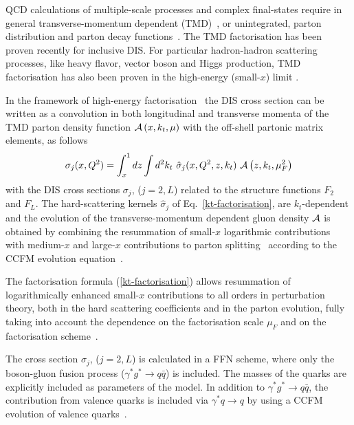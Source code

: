 \def\kt{\ensuremath{k_t}}
\def\pt{\ensuremath{p_t}}


QCD calculations of multiple-scale processes  and complex final-states
require in general transverse-momentum dependent (TMD)~\cite{Collins:2011zzd}, or 
unintegrated, parton distribution and parton decay 
functions~\cite{Aybat:2011zv,Buffing:2013eka,Buffing:2013kca,Buffing:2012sz,Mulders:2008tf,Jadach:2009gm,Hautmann:2009zzb,Hautmann:2012pf,Hautmann:2007gw}.   
The TMD factorisation has been proven recently \cite{Collins:2011zzd} for inclusive DIS. For 
particular hadron-hadron scattering processes, like heavy flavor, vector boson and Higgs production, 
TMD factorisation has also been proven in the high-energy (small-$x$) limit \cite{Catani:1990xk,Collins:1991ty,Hautmann:2010be}.
  
In the framework of high-energy factorisation~\cite{Catani:1990xk,Catani:1990eg,Catani:1993ww} 
the DIS cross section can be written as a convolution in 
both longitudinal and transverse momenta of the TMD parton density function 
${\cal A}\left(x,\kt,\mu\right)$    
 with the off-shell partonic matrix elements, as follows 
\begin{equation}
 \sigma_j (x, Q^2) = \int_x^1  
d z \int d^2k_t \ 
\hat{\sigma}_j(x,Q^2,{z},k_t) \ 
 {\cal  A}\left( {z} ,\kt, \mu_{F}^2 \right) 
\label{kt-factorisation}
\end{equation}
with the DIS cross sections 
$\sigma_j$, ($j= 2 , L$) related to the  structure functions $F_2$ and $F_L$.
The hard-scattering kernels ${\hat \sigma}_j$ of Eq.~\ref{kt-factorisation},    are $k_t$-dependent and the evolution  of the 
transverse-momentum dependent gluon density 
${\cal A} $ is obtained by combining the resummation of small-$x$ logarithmic 
contributions \cite{Lipatov:1996ts,Fadin:1975cb,Balitsky:1978ic} with medium-$x$ and large-$x$ 
contributions to parton  splitting~\cite{Gribov:1972ri,Altarelli:1977zs,Dokshitzer:1977sg} according to the 
CCFM evolution equation~\cite{Ciafaloni:1987ur,Catani:1989sg,Marchesini:1994wr}.
  
The factorisation formula (\ref{kt-factorisation})  
allows resummation of logarithmically enhanced small-$x$ contributions  
to all orders in perturbation theory,  
both in the  hard scattering coefficients and 
in the parton evolution, fully taking into account the 
dependence on the factorisation scale $\mu_{F}$ and on the 
factorisation scheme~\cite{Catani:1994sq,Catani:1993rn}.  
 
The cross section $\sigma_j$, ($j= 2, L$) is calculated in a FFN scheme, where
only the boson-gluon fusion process ($\gamma^* g^* \to q \bar{q}$) is included. The masses of the 
quarks are explicitly included as parameters of the model.
In addition to $\gamma^* g^* \to q\bar{q}$,  the contribution from valence quarks is included 
via $\gamma^* q \to q$ by using a CCFM evolution of 
valence quarks~\cite{Deak:2010gk,Hautmann:2013tba}. 

